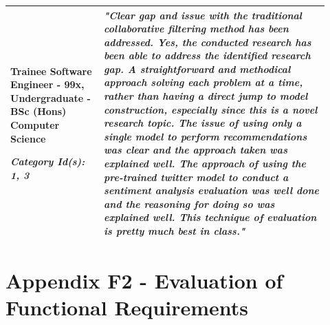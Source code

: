 \begin{longtable}{|p{0.27\linewidth}|p{0.655\linewidth}|}
Trainee Software Engineer - 99x,
Undergraduate - BSc (Hons) Computer Science

\textit{Category Id(s): 1, 3}
 & 
 \textit{"Clear gap and issue with the traditional collaborative filtering method has been addressed. Yes, the conducted research has been able to address the identified research gap. A straightforward and methodical approach solving each problem at a time, rather than having a direct jump to model construction, especially since this is a novel research topic. The issue of using only a single model to perform recommendations was clear and the approach taken was explained well.  The approach of using the pre-trained twitter model to conduct a sentiment analysis evaluation was well done and the reasoning for doing so was explained well. This technique of evaluation is pretty much best in class."}
 \\
\hline

\end{longtable}

\newpage
\section*{Appendix F2 - Evaluation of Functional Requirements}

